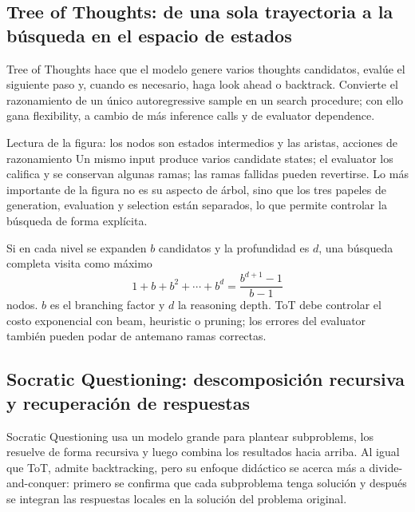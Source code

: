 \subsection{Tree of Thoughts: de una sola trayectoria a la búsqueda en el espacio de estados}

Tree of Thoughts hace que el modelo genere varios thoughts candidatos, evalúe el siguiente paso y, cuando es necesario, haga look ahead o backtrack. Convierte el razonamiento de un único autoregressive sample en un search procedure; con ello gana flexibility, a cambio de más inference calls y de evaluator dependence.


\begin{knowledgebox}{Lectura de la figura: los nodos son estados intermedios y las aristas, acciones de razonamiento}
Un mismo input produce varios candidate states; el evaluator los califica y se conservan algunas ramas; las ramas fallidas pueden revertirse. Lo más importante de la figura no es su aspecto de árbol, sino que los tres papeles de generation, evaluation y selection están separados, lo que permite controlar la búsqueda de forma explícita.
\end{knowledgebox}

Si en cada nivel se expanden $b$ candidatos y la profundidad es $d$, una búsqueda completa visita como máximo
\[
1+b+b^2+\cdots+b^d=\frac{b^{d+1}-1}{b-1}
\]
nodos. $b$ es el branching factor y $d$ la reasoning depth. ToT debe controlar el costo exponencial con beam, heuristic o pruning; los errores del evaluator también pueden podar de antemano ramas correctas.

\subsection{Socratic Questioning: descomposición recursiva y recuperación de respuestas}

Socratic Questioning usa un modelo grande para plantear subproblems, los resuelve de forma recursiva y luego combina los resultados hacia arriba. Al igual que ToT, admite backtracking, pero su enfoque didáctico se acerca más a divide-and-conquer: primero se confirma que cada subproblema tenga solución y después se integran las respuestas locales en la solución del problema original.


